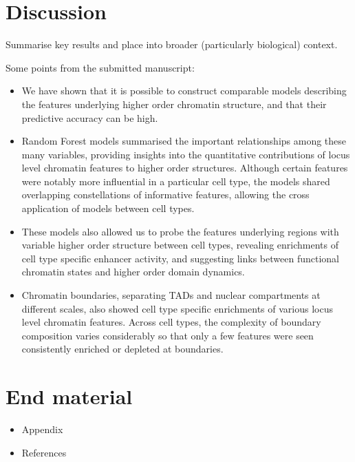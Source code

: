 \documentclass[a4paper,10pt,oneside]{book}
\begin{document}
\chapter{Discussion}

Summarise key results and place into broader (particularly biological)
context.

Some points from the submitted manuscript:

\begin{itemize}
\itemsep1pt\parskip0pt
\item
  We have shown that it is possible to construct comparable models
  describing the features underlying higher order chromatin structure,
  and that their predictive accuracy can be high.
\item
  Random Forest models summarised the important relationships among
  these many variables, providing insights into the quantitative
  contributions of locus level chromatin features to higher order
  structures. Although certain features were notably more influential in
  a particular cell type, the models shared overlapping constellations
  of informative features, allowing the cross application of models
  between cell types.
\item
  These models also allowed us to probe the features underlying regions
  with variable higher order structure between cell types, revealing
  enrichments of cell type specific enhancer activity, and suggesting
  links between functional chromatin states and higher order domain
  dynamics.
\item
  Chromatin boundaries, separating TADs and nuclear compartments at
  different scales, also showed cell type specific enrichments of
  various locus level chromatin features. Across cell types, the
  complexity of boundary composition varies considerably so that only a
  few features were seen consistently enriched or depleted at
  boundaries.
\end{itemize}

\chapter{End material}

\begin{itemize}
\itemsep1pt\parskip0pt
\item
  Appendix
\item
  References
\end{itemize}


\begin{small}

\end{small}
\end{document}
